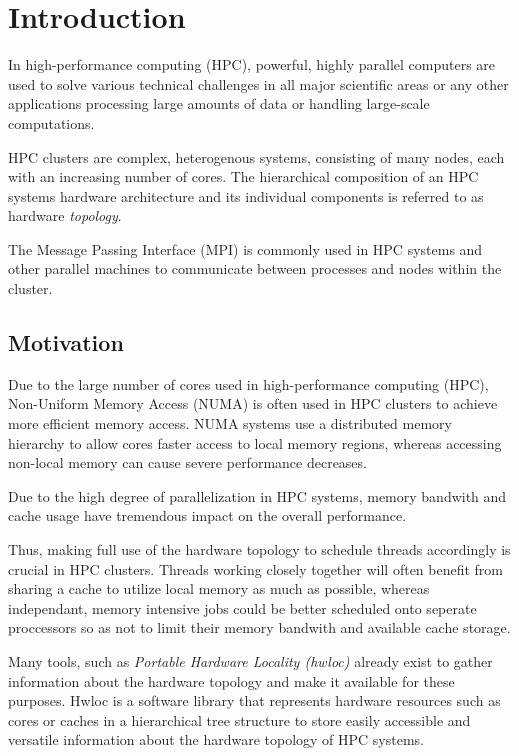 \chapter{Introduction}\label{chapter:introduction}
In high-performance computing (HPC), powerful, highly parallel computers are used to solve various technical challenges in all major scientific areas or any other applications processing
large amounts of data or handling large-scale computations. \cite{hpc_intro}

HPC clusters are complex, heterogenous systems, consisting of many nodes, each with an increasing number of cores.
The hierarchical composition of an HPC systems hardware architecture and its individual components is referred to as hardware \emph{topology}. \cite{topology_intro}

The Message Passing Interface (MPI) is commonly used in HPC systems and other parallel machines to communicate between processes and nodes within the cluster. \cite{mpi_intro} 

\section{Motivation}
Due to the large number of cores used in high-performance computing (HPC), Non-Uniform Memory Access (NUMA) is often used in HPC clusters to achieve more efficient memory access.
NUMA systems use a distributed memory hierarchy to allow cores faster access to local memory regions, whereas accessing non-local memory can cause severe performance decreases. \cite{nuioa_intro}

Due to the high degree of parallelization in HPC systems, memory bandwith and cache usage have tremendous impact on the overall performance. \cite{openmp_intro}

Thus, making full use of the hardware topology to schedule threads accordingly is crucial in HPC clusters.
Threads working closely together will often benefit from sharing a cache to utilize local memory as much as possible,
whereas independant, memory intensive jobs could be better scheduled onto seperate proccessors so as not to limit their memory bandwith and available cache storage. \cite{hwloc_paper}

Many tools, such as \emph{Portable Hardware Locality (hwloc)} \cite{hwloc} already exist to gather information about the hardware topology and make it available for these purposes.
Hwloc is a software library that represents hardware resources such as cores or caches in a hierarchical tree structure
to store easily accessible and versatile information about the hardware topology of HPC systems. \cite{hwloc_paper}

